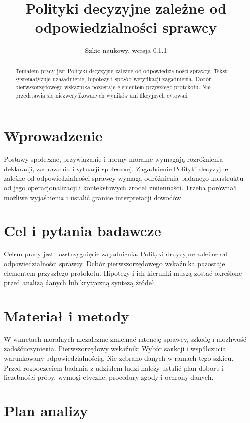 \documentclass[11pt,a4paper]{article}
\title{Polityki decyzyjne zależne od odpowiedzialności sprawcy}
\author{}
\date{Szkic naukowy, wersja 0.1.1}
\begin{document}
\maketitle

\begin{abstract}

Tematem pracy jest Polityki decyzyjne zależne od odpowiedzialności sprawcy. Tekst systematyzuje uzasadnienie, hipotezy i sposób weryfikacji zagadnienia. Dobór pierwszorzędowego wskaźnika pozostaje elementem przyszłego protokołu. Nie przedstawia się niezweryfikowanych wyników ani fikcyjnych cytowań.

\end{abstract}

\section{Wprowadzenie}

Postawy społeczne, przywiązanie i normy moralne wymagają rozróżnienia deklaracji, zachowania i sytuacji społecznej. Zagadnienie Polityki decyzyjne zależne od odpowiedzialności sprawcy wymaga odróżnienia badanego konstruktu od jego operacjonalizacji i kontekstowych źródeł zmienności. Trzeba porównać możliwe wyjaśnienia i ustalić granice interpretacji dowodów.

\section{Cel i pytania badawcze}

Celem pracy jest rozstrzygnięcie zagadnienia: Polityki decyzyjne zależne od odpowiedzialności sprawcy. Dobór pierwszorzędowego wskaźnika pozostaje elementem przyszłego protokołu. Hipotezy i ich kierunki muszą zostać określone przed analizą danych lub krytyczną syntezą źródeł.

\section{Materiał i metody}

W winietach moralnych niezależnie zmieniać intencję sprawcy, szkodę i możliwość zadośćuczynienia. Pierwszorzędowy wskaźnik: Wybór sankcji i współczucia warunkowany odpowiedzialnością. Nie zebrano danych w ramach tego szkicu. Przed rozpoczęciem badania z udziałem ludzi należy ustalić plan doboru i liczebności próby, wymogi etyczne, procedury zgody i ochrony danych.

\section{Plan analizy}
\end{document}
